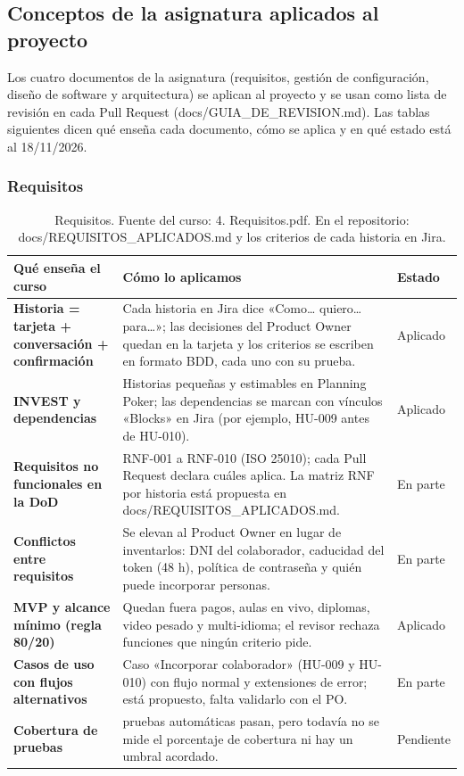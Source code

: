 \documentclass[11pt,a4paper]{article}
\begin{document}
\subsection{Conceptos de la asignatura aplicados al proyecto}
Los cuatro documentos de la asignatura (requisitos, gestión de configuración, diseño de software y arquitectura) se aplican al proyecto y se usan como lista de revisión en cada Pull Request (docs/GUIA\_DE\_REVISION.md). Las tablas siguientes dicen qué enseña cada documento, cómo se aplica y en qué estado está al 18/11/2026.

\subsubsection*{Requisitos}
\begin{table}[H]
\centering
\scriptsize
\renewcommand{\arraystretch}{1.2}
\begin{tabularx}{\linewidth}{|>{\raggedright\arraybackslash}p{3.6cm}|>{\raggedright\arraybackslash}X|>{\centering\arraybackslash}p{1.6cm}|}
\hline
\rowcolor{gray!15}
\textbf{Qué enseña el curso} & \textbf{Cómo lo aplicamos} & \textbf{Estado} \\
\hline
\textbf{Historia = tarjeta + conversación + confirmación} & Cada historia en Jira dice «Como… quiero… para…»; las decisiones del Product Owner quedan en la tarjeta y los criterios se escriben en formato BDD, cada uno con su prueba. & Aplicado \\
\hline
\textbf{INVEST y dependencias} & Historias pequeñas y estimables en Planning Poker; las dependencias se marcan con vínculos «Blocks» en Jira (por ejemplo, HU-009 antes de HU-010). & Aplicado \\
\hline
\textbf{Requisitos no funcionales en la DoD} & RNF-001 a RNF-010 (ISO 25010); cada Pull Request declara cuáles aplica. La matriz RNF por historia está propuesta en docs/REQUISITOS\_APLICADOS.md. & En parte \\
\hline
\textbf{Conflictos entre requisitos} & Se elevan al Product Owner en lugar de inventarlos: DNI del colaborador, caducidad del token (48 h), política de contraseña y quién puede incorporar personas. & En parte \\
\hline
\textbf{MVP y alcance mínimo (regla 80/20)} & Quedan fuera pagos, aulas en vivo, diplomas, video pesado y multi-idioma; el revisor rechaza funciones que ningún criterio pide. & Aplicado \\
\hline
\textbf{Casos de uso con flujos alternativos} & Caso «Incorporar colaborador» (HU-009 y HU-010) con flujo normal y extensiones de error; está propuesto, falta validarlo con el PO. & En parte \\
\hline
\textbf{Cobertura de pruebas} & 134 pruebas automáticas pasan, pero todavía no se mide el porcentaje de cobertura ni hay un umbral acordado. & Pendiente \\
\hline
\end{tabularx}
\caption{Requisitos. Fuente del curso: 4. Requisitos.pdf. En el repositorio: docs/REQUISITOS\_APLICADOS.md y los criterios de cada historia en Jira.}
\end{table}
\end{document}
